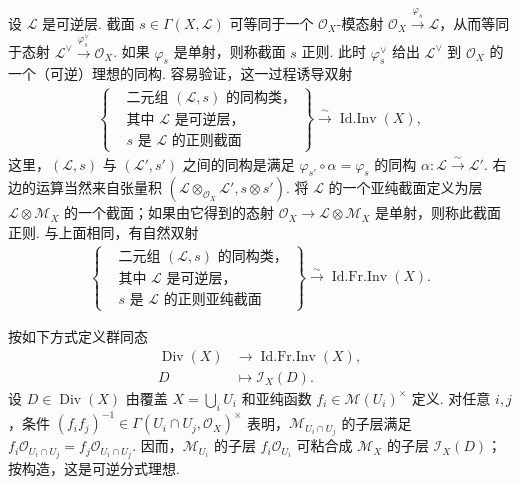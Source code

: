 \begin{remark}\label{item:ag-1-1-9}
设 $\mathcal L$ 是可逆层. 截面 $s\in\Gamma(X,\mathcal L)$ 可等同于一个 $\mathcal O_X$-模态射 $\mathcal O_X\xrightarrow{\varphi_s}\mathcal L$，从而等同于态射 $\mathcal L^\vee\xrightarrow{\varphi_s^\vee}\mathcal O_X$. 如果 $\varphi_s$ 是单射，则称截面 $s$ 正则. 此时 $\varphi_s^\vee$ 给出 $\mathcal L^\vee$ 到 $\mathcal O_X$ 的一个（可逆）理想的同构. 容易验证，这一过程诱导双射
\begin{align*}
\left\{\begin{aligned}&\text{二元组 $(\mathcal L,s)$ 的同构类，}\\&\text{其中 $\mathcal L$ 是可逆层，}\\&\text{$s$ 是 $\mathcal L$ 的正则截面}\end{aligned}\right\}
\xrightarrow\sim\operatorname{Id.Inv}(X),
\end{align*}
这里，$(\mathcal L,s)$ 与 $(\mathcal L',s')$ 之间的同构是满足 $\varphi_{s'}\circ\alpha=\varphi_s$ 的同构 $\alpha:\mathcal L\xrightarrow\sim\mathcal L'$. 右边的运算当然来自张量积 $(\mathcal L\otimes_{\mathcal O_X}\mathcal L',s\otimes s')$.
将 $\mathcal L$ 的一个亚纯截面定义为层 $\mathcal L\otimes\mathcal M_X$ 的一个截面；如果由它得到的态射 $\mathcal O_X\longrightarrow\mathcal L\otimes\mathcal M_X$ 是单射，则称此截面正则. 与上面相同，有自然双射
\begin{align*}
\left\{\begin{aligned}&\text{二元组 $(\mathcal L,s)$ 的同构类，}\\&\text{其中 $\mathcal L$ 是可逆层，}\\&\text{$s$ 是 $\mathcal L$ 的正则亚纯截面}\end{aligned}\right\}
\xrightarrow\sim\operatorname{Id.Fr.Inv}(X).\tag*{$\diamond$}
\end{align*}
\renewcommand{\envenddiamond}{}%
\end{remark}
\begin{numpara}\label{item:ag-1-1-10}
按如下方式定义群同态
\begin{align*}
\operatorname{Div}(X)&\longrightarrow\operatorname{Id.Fr.Inv}(X),\\
D&\longmapsto\mathcal I_X(D).
\end{align*}
设 $D\in\operatorname{Div}(X)$ 由覆盖 $X=\bigcup_iU_i$ 和亚纯函数 $f_i\in\mathcal M(U_i)^\times$ 定义. 对任意 $i,j$，条件 $(f_if_j)^{-1}\in\Gamma(U_i\cap U_j,\mathcal O_X)^\times$ 表明，$\mathcal M_{U_i\cap U_j}$ 的子层满足 $f_i\mathcal O_{U_i\cap U_j}=f_j\mathcal O_{U_i\cap U_j}$. 因而，$\mathcal M_{U_i}$ 的子层 $f_i\mathcal O_{U_i}$ 可粘合成 $\mathcal M_X$ 的子层 $\mathcal I_X(D)$；按构造，这是可逆分式理想.
\end{numpara}
